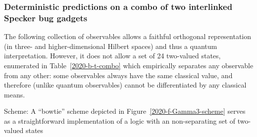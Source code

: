 \subsubsection{Deterministic predictions on a combo of two interlinked Specker bug gadgets}
\label{2017-b-bugscombino}

The following collection of observables allows a faithful orthogonal representation (in three- and higher-dimensional Hilbert spaces) and thus
a quantum interpretation. However, it does not allow a set of 24 two-valued states, enumerated in Table~\ref{2020-b-t-combo}
which empirically separates any observable from any other:
some observables always have the same classical value, and therefore (unlike quantum observables) cannot be differentiated by any classical means.

Scheme:
A ``bowtie'' scheme depicted in Figure~\ref{2020-f-Gamma3-scheme}
serves as a straightforward implementation of a logic with an non-separating set of two-valued states
